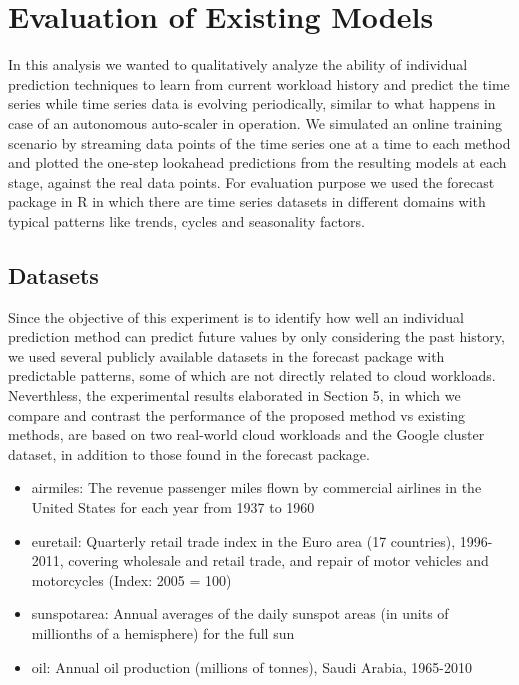 \section{Evaluation of Existing Models}

In this analysis we wanted to qualitatively analyze the ability of individual prediction techniques to learn from current workload history and predict the time series while time series data is evolving periodically, similar to what happens in case of an autonomous auto-scaler in operation. We simulated an online training scenario by streaming data points of the time series one at a time to each method and plotted the one-step lookahead predictions from the resulting models at each stage, against the real data points. For evaluation purpose we used the forecast package in R \cite{forecastPackage} in which there are time series datasets in different domains with typical patterns like trends, cycles and seasonality factors.

\subsection{Datasets}
Since the objective of this experiment is to identify how well an individual prediction method can predict future values by only considering the past history, we used several publicly available datasets in the forecast package with predictable patterns, some of which are not directly related to cloud workloads. Neverthless, the experimental results elaborated in Section 5, in which we compare and contrast the performance of the proposed method vs existing methods, are based on two real-world cloud workloads and the Google cluster dataset, in addition to those found in the forecast package.

\begin{itemize}
\item airmiles: The revenue passenger miles flown by commercial airlines in the United States for each year from 1937 to 1960
\item euretail: Quarterly retail trade index in the Euro area (17 countries), 1996-2011, covering wholesale and retail trade, and repair of motor vehicles and motorcycles (Index: 2005 = 100)
\item sunspotarea: Annual averages of the daily sunspot areas (in units of millionths of a hemisphere) for the full sun
\item oil: Annual oil production (millions of tonnes), Saudi Arabia, 1965-2010
\end{itemize}

